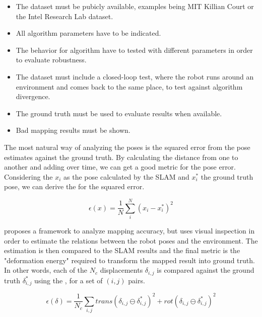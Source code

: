 \begin{itemize}
    \item The dataset must be pubicly available, examples being MIT Killian Court or the Intel Research Lab dataset.
    \item All algorithm parameters have to be indicated.
    \item The behavior for algorithm have to tested with different parameters in order to evaluate robustness.
    \item The dataset must include a closed-loop test, where the robot runs around an environment and comes back to the same place, to test against algorithm divergence.
    \item The ground truth must be used to evaluate results when available.
    \item Bad mapping results must be shown.
\end{itemize}

The most natural way of analyzing the poses is the squared error from the pose estimates against the ground truth. By calculating the distance from one to another and adding over time, we can get a good metric for the pose error. Considering the $x_i$ as the pose calculated by the SLAM and $x_i^*$ the ground truth pose, we can derive the  for the squared error.

\begin{equation}\label{eq:error_squared}
\epsilon(x) = \frac{1}{N} \sum_{i}^N (x_i - x_i^*)^2
\end{equation}

\citeauthor{kummerle2009measuring} proposes a framework to analyze mapping accuracy, but uses visual inspection in order to estimate the relations between the robot poses and the environment. The estimation is then compared to the SLAM results and the final metric is the "deformation energy" required to transform the mapped result into ground truth. In other words, each of the $N_c$ displacements $\delta_{i,j}$ is compared against the ground truth $\delta_{i,j}^*$ using the , for a set of  $(i,j)$ pairs.

\begin{equation}\label{eq:displacement}
    \epsilon(\delta) = \frac{1}{N_c} \sum_{i, j} trans(\delta_{i,j} \ominus \delta_{i,j}^*)^2 + rot(\delta_{i,j} \ominus \delta_{i,j}^*)^2
\end{equation}

